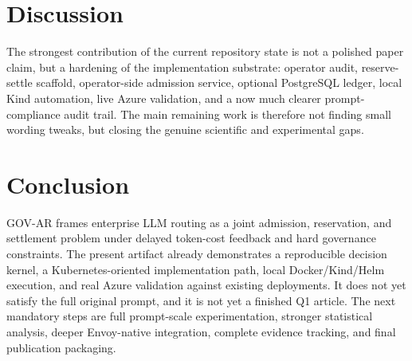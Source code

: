 \documentclass[10pt,journal,compsoc]{IEEEtran}
\begin{document}
\section{Discussion}
The strongest contribution of the current repository state is not a polished
paper claim, but a hardening of the implementation substrate: operator audit,
reserve-settle scaffold, operator-side admission service, optional PostgreSQL
ledger, local Kind automation, live Azure validation, and a now much clearer
prompt-compliance audit trail. The main remaining work is therefore not finding
small wording tweaks, but closing the genuine scientific and experimental gaps.

\section{Conclusion}
GOV-AR frames enterprise LLM routing as a joint admission, reservation, and
settlement problem under delayed token-cost feedback and hard governance
constraints. The present artifact already demonstrates a reproducible decision
kernel, a Kubernetes-oriented implementation path, local Docker/Kind/Helm
execution, and real Azure validation against existing deployments. It does not
yet satisfy the full original prompt, and it is not yet a finished Q1 article.
The next mandatory steps are full prompt-scale experimentation, stronger
statistical analysis, deeper Envoy-native integration, complete evidence
tracking, and final publication packaging.



\end{document}
